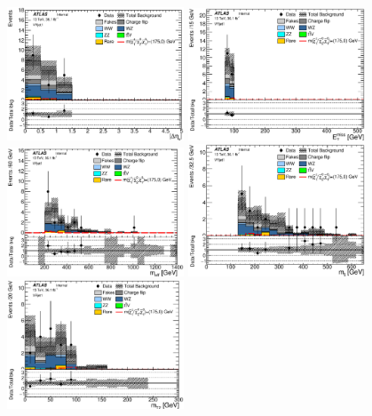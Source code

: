 \begin{figure}[htbp]
\centering
\includegraphics[width=0.47\textwidth]{data/plot/VR/all_DEtall_VRjet1.eps}
\includegraphics[width=0.47\textwidth]{data/plot/VR/all_Met_VRjet1.eps} \\
\includegraphics[width=0.47\textwidth]{data/plot/VR/all_Meff_VRjet1.eps}
\includegraphics[width=0.47\textwidth]{data/plot/VR/all_Mlj_VRjet1.eps} \\
\includegraphics[width=0.47\textwidth]{data/plot/VR/all_Mt2_VRjet1.eps}

\end{figure}
